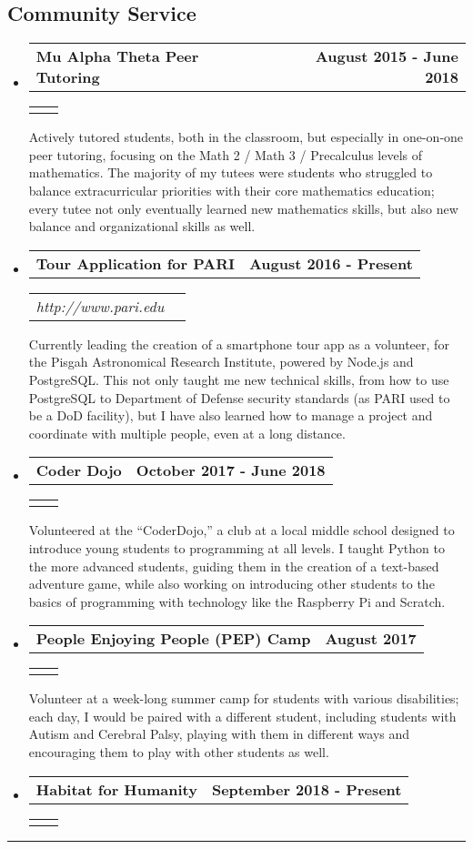 \documentclass[10pt,letterpaper]{article}
\makeatletter
\newcommand{\headerrow}[2]
{\begin{tabular*}{\linewidth}{l@{\extracolsep{\fill}}r}
	#1 &
	#2 \\
\end{tabular*}}
\newcommand{\basicitem}[5]
{
	\item
	\headerrow
		{\textbf{#1}}
		{\textbf{#2}}
	\ifthenelse{\equal{#3}{} \AND \equal{#4}{}}
		{}
		{
			\headerrow
			{\emph{#3}}
			{\emph{#4}}
		}
	#5
}
\makeatother
\begin{document}
\subsection*{Community Service}
\begin{itemize}
	\parskip=0.1em

	\basicitem
		{Mu Alpha Theta Peer Tutoring}
		{August 2015 - June 2018}
		{}
		{}
		{Actively tutored students, both in the classroom, but especially in one-on-one peer tutoring, focusing on the Math 2 / Math 3 / Precalculus levels of mathematics. The majority of my tutees were students who struggled to balance extracurricular priorities with their core mathematics education; every tutee not only eventually learned new mathematics skills, but also new balance and organizational skills as well.}

	\basicitem
		{Tour Application for PARI}
		{August 2016 - Present}
		{http://www.pari.edu}
		{}
		{Currently leading the creation of a smartphone tour app as a volunteer, for the Pisgah Astronomical Research Institute, powered by Node.js and PostgreSQL. This not only taught me new technical skills, from how to use PostgreSQL to Department of Defense security standards (as PARI used to be a DoD facility), but I have also learned how to manage a project and coordinate with multiple people, even at a long distance.}

	\basicitem
		{Coder Dojo}
		{October 2017 - June 2018}
		{}
		{}
		{Volunteered at the “CoderDojo,” a club at a local middle school designed to introduce young students to programming at all levels. I taught Python to the more advanced students, guiding them in the creation of a text-based adventure game, while also working on introducing other students to the basics of programming with technology like the Raspberry Pi and Scratch.}

	\basicitem
		{People Enjoying People (PEP) Camp}
		{August 2017}
		{}
		{}
		{Volunteer at a week-long summer camp for students with various disabilities; each day, I would be paired with a different student, including students with Autism and Cerebral Palsy, playing with them in different ways and encouraging them to play with other students as well.}

	\basicitem
		{Habitat for Humanity}
		{September 2018 - Present}
		{}
		{}
		{}
	
\end{itemize}

\hrule
\vspace{-0.4em}
\end{document}
